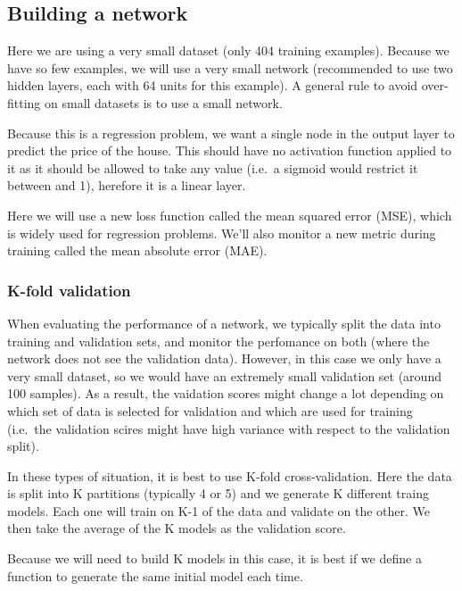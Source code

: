 \documentclass[11pt]{article}
\begin{document}
    \hypertarget{building-a-network}{%
\subsection{Building a network}\label{building-a-network}}

Here we are using a very small dataset (only 404 training examples).
Because we have so few examples, we will use a very small network
(recommended to use two hidden layers, each with 64 units for this
example). A general rule to avoid over-fitting on small datasets is to
use a small network.

Because this is a regression problem, we want a single node in the
output layer to predict the price of the house. This should have no
activation function applied to it as it should be allowed to take any
value (i.e.~a sigmoid would restrict it between and 1), herefore it is a
linear layer.

Here we will use a new loss function called the mean squared error
(MSE), which is widely used for regression problems. We'll also monitor
a new metric during training called the mean absolute error (MAE).

\hypertarget{k-fold-validation}{%
\subsubsection{K-fold validation}\label{k-fold-validation}}

When evaluating the performance of a network, we typically split the
data into training and validation sets, and monitor the perfomance on
both (where the network does not see the validation data). However, in
this case we only have a very small dataset, so we would have an
extremely small validation set (around 100 samples). As a result, the
vaidation scores might change a lot depending on which set of data is
selected for validation and which are used for training (i.e.~the
validation scires might have high variance with respect to the
validation split).

In these types of situation, it is best to use K-fold cross-validation.
Here the data is split into K partitions (typically 4 or 5) and we
generate K different traing models. Each one will train on K-1 of the
data and validate on the other. We then take the average of the K models
as the validation score.

Because we will need to build K models in this case, it is best if we
define a function to generate the same initial model each time.
\end{document}
